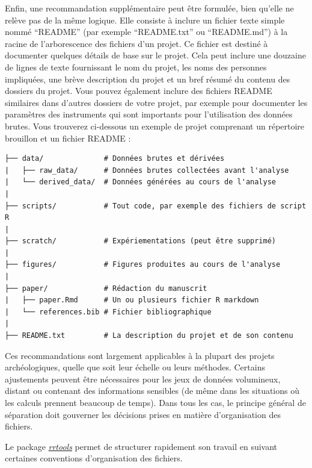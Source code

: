 \documentclass[
  french,
]{scrbook}
\begin{document}
Enfin, une recommandation supplémentaire peut être formulée, bien qu'elle ne relève pas de la même logique. Elle consiste à inclure un fichier texte simple nommé ``README'' (par exemple ``README.txt'' ou ``README.md'') à la racine de l'arborescence des fichiers d'un projet. Ce fichier est destiné à documenter quelques détails de base sur le projet. Cela peut inclure une douzaine de lignes de texte fournissant le nom du projet, les noms des personnes impliquées, une brève description du projet et un bref résumé du contenu des dossiers du projet. Vous pouvez également inclure des fichiers README similaires dans d'autres dossiers de votre projet, par exemple pour documenter les paramètres des instruments qui sont importants pour l'utilisation des données brutes. Vous trouverez ci-dessous un exemple de projet comprenant un répertoire brouillon et un fichier README :

\begin{verbatim}
├── data/              # Données brutes et dérivées
|   ├── raw_data/      # Données brutes collectées avant l'analyse
|   └── derived_data/  # Données générées au cours de l'analyse
|
├── scripts/           # Tout code, par exemple des fichiers de script R
|
├── scratch/           # Expériementations (peut être supprimé)
|
├── figures/           # Figures produites au cours de l'analyse
|
├── paper/             # Rédaction du manuscrit
|   ├── paper.Rmd      # Un ou plusieurs fichier R markdown
|   └── references.bib # Fichier bibliographique
|
├── README.txt         # La description du projet et de son contenu
\end{verbatim}

Ces recommandations sont largement applicables à la plupart des projets archéologiques, quelle que soit leur échelle ou leurs méthodes. Certains ajustements peuvent être nécessaires pour les jeux de données volumineux, distant ou contenant des informations sensibles (de même dans les situations où les calculs prennent beaucoup de temps). Dans tous les cas, le principe général de séparation doit gouverner les décisions prises en matière d'organisation des fichiers.

\begin{tcolorbox}[fonttitle=\sffamily\bfseries\large,title=Conseil,colframe=darkcyan]

Le package \href{https://github.com/benmarwick/rrtools}{\emph{rrtools}} permet de structurer rapidement son travail en suivant certaines conventions d'organisation des fichiers.

\end{tcolorbox}
\end{document}
